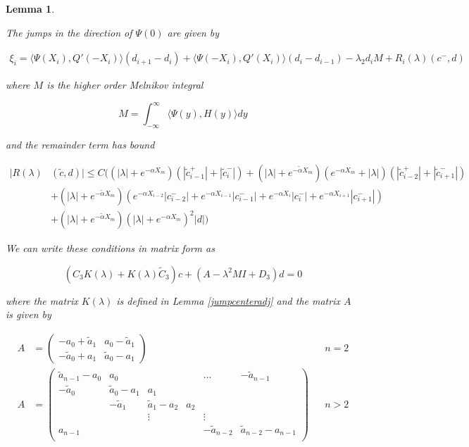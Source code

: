 \documentclass[12pt]{article}
\newtheorem{lemma}{Lemma}
\begin{document}
\begin{lemma}\label{jumpadj}

The jumps in the direction of $\Psi(0)$ are given by

\begin{align}\label{xi}
\xi_i = \langle \Psi(X_i), Q'(-X_i) \rangle (d_{i+1} - d_i)
+ \langle \Psi(-X_i), Q'(X_i) \rangle (d_i - d_{i-1})
- \lambda_2 d_i M + R_i(\lambda)(c^-, d)
\end{align}

where $M$ is the higher order Melnikov integral

\begin{equation}\label{M}
M = \int_{-\infty}^\infty \langle \Psi(y), H(y) \rangle dy 
\end{equation}

and the remainder term has bound

\begin{align}\label{R}
|R(\lambda)&(\tilde{c}, d)| \leq C \Big(
(|\lambda| + e^{-\alpha X_m})(|\tilde{c}_{i-1}^+| + |\tilde{c}_{i}^-|) + (|\lambda| + e^{-\tilde{\alpha} X_m})(e^{-\alpha X_m} + |\lambda|) ( |\tilde{c}_{i-2}^+| + |\tilde{c}_{i+1}^-|) \\
&+ (|\lambda| + e^{-\tilde{\alpha} X_m})( e^{-\alpha X_{i-2}} |c_{i-2}^-| + e^{-\alpha X_{i-1}} |c_{i-1}^-| + e^{-\alpha X_i} |c_i^-| + e^{-\alpha X_{i+1}} |c_{i+1}^-|) \nonumber \\
&+ (|\lambda| + e^{-\tilde{\alpha} X_m})(|\lambda| + e^{-\alpha X_m})^2 |d| \nonumber \Big)
\end{align}

We can write these conditions in matrix form as

\begin{equation}
(C_3 K(\lambda) + K(\lambda) \tilde{C}_3) c + (A -\lambda^2 M I + D_3)d = 0
\end{equation}

where the matrix $K(\lambda)$ is defined in Lemma \ref{jumpcenteradj} and the matrix $A$ is given by

\begin{align*}
A &= \begin{pmatrix}
-a_0 + \tilde{a}_1 & a_0 - \tilde{a}_1 \\
-\tilde{a}_0 + a_1 & \tilde{a}_0 - a_1
\end{pmatrix} && n = 2 \\
A &= \begin{pmatrix}
\tilde{a}_{n-1} - a_0 & a_0 & & & \dots & -\tilde{a}_{n-1}\\
-\tilde{a}_0 & \tilde{a}_0 - a_1 &  a_1 \\
& -\tilde{a}_1 & \tilde{a}_1 - a_2 &  a_2 \\
& & \vdots & & \vdots \\
a_{n-1} & & & & -\tilde{a}_{n-2} & \tilde{a}_{n-2} - a_{n-1} \\
\end{pmatrix} && n > 2
\end{align*}


\end{lemma}
\end{document}
